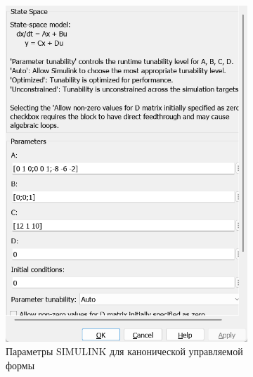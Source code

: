 \documentclass[a4paper, 12pt]{article}
\begin{document}
\begin{figure}[H]
\begin{subfigure}{0.3\textwidth}
            \includegraphics[width=\linewidth]{canonical_controlled_form_1_window.png}
            \caption{Параметры SIMULINK для канонической управляемой формы}
            \label{fig:ccf1w}
        \end{subfigure}
        \begin{subfigure}{0.3\textwidth}
            \centering

\end{subfigure}
\end{figure}
\end{document}
